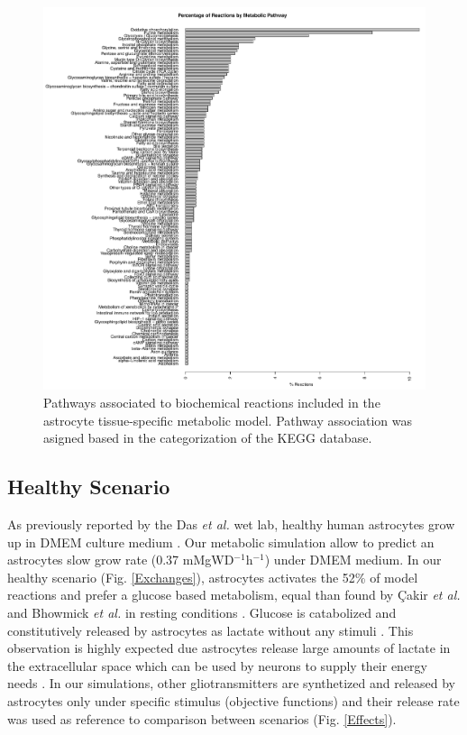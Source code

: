 \begin{figure}
\begin{center}
\includegraphics[width=\textwidth]{neuroprotective/Pathways}
\end{center}
\caption{Pathways associated to biochemical reactions included in the astrocyte tissue-specific metabolic model. Pathway association was asigned based in the categorization of the KEGG database.}
\label{Pathways}
\end{figure}

\subsection*{Healthy Scenario}
As previously reported by the Das \emph{et al.} wet lab, healthy human astrocytes grow up in DMEM culture medium \cite{Das2010}. Our metabolic simulation allow to predict an astrocytes slow grow rate  (0.37 mMgWD$^{-1}$h$^{-1}$) under DMEM medium. In our healthy scenario (Fig. \ref{Exchanges}), astrocytes activates the 52\% of model reactions and prefer a glucose based metabolism, equal than found by Çakir \emph{et al.} and Bhowmick \emph{et al.} in resting conditions \cite{Cakir2007,Bhowmick2015}. Glucose is catabolized and constitutively released by astrocytes as lactate without any stimuli \cite{LeFoll2016}. This observation is highly expected due astrocytes release large amounts of lactate in the extracellular space which can be used by neurons to supply their energy needs \cite{Allaman2011}.  In our simulations, other gliotransmitters are synthetized and released by astrocytes only under specific stimulus (objective functions) and their release rate was used as reference to comparison between scenarios (Fig. \ref{Effects}). 

